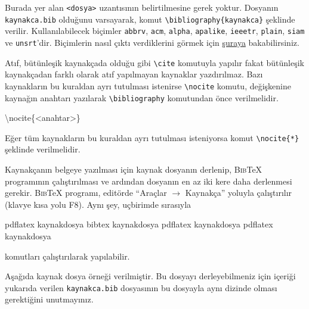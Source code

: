 \documentclass[
  letterpaper,
  DIV=11,
  numbers=noendperiod]{scrreprt}
\newenvironment{Shaded}{\begin{snugshade}}{\end{snugshade}}
\newcommand{\ExtensionTok}[1]{\textcolor[rgb]{0.00,0.23,0.31}{#1}}
\newcommand{\KeywordTok}[1]{\textcolor[rgb]{0.00,0.23,0.31}{#1}}
\newcommand{\NormalTok}[1]{\textcolor[rgb]{0.00,0.23,0.31}{#1}}
\begin{document}
Burada yer alan \texttt{\textless{}dosya\textgreater{}} uzantısının
belirtilmesine gerek yoktur. Dosyanın \texttt{kaynakca.bib} olduğunu
varsayarak, komut \texttt{\textbackslash{}bibliography\{kaynakca\}}
şeklinde verilir. Kullanılabilecek biçimler \texttt{abbrv},
\texttt{acm}, \texttt{alpha}, \texttt{apalike}, \texttt{ieeetr},
\texttt{plain}, \texttt{siam} ve \texttt{unsrt}'dir. Biçimlerin nasıl
çıktı verdiklerini görmek için
\href{https://tr.overleaf.com/learn/latex/Bibtex_bibliography_styles}{şuraya}
bakabilirsiniz.

Atıf, bütünleşik kaynakçada olduğu gibi \texttt{\textbackslash{}cite}
komutuyla yapılır fakat bütünleşik kaynakçadan farklı olarak atıf
yapılmayan kaynaklar yazdırılmaz. Bazı kaynakların bu kuraldan ayrı
tutulması istenirse \texttt{\textbackslash{}nocite} komutu, değişkenine
kaynağın anahtarı yazılarak \texttt{\textbackslash{}bibliography}
komutundan önce verilmelidir.

\begin{Shaded}
\begin{Highlighting}[]
\KeywordTok{\textbackslash{}nocite}\NormalTok{\{}\ExtensionTok{\textless{}anahtar\textgreater{}}\NormalTok{\}}
\end{Highlighting}
\end{Shaded}

Eğer tüm kaynakların bu kuraldan ayrı tutulması isteniyorsa komut
\texttt{\textbackslash{}nocite\{*\}} şeklinde verilmelidir.

Kaynakçanın belgeye yazılması için kaynak dosyanın derlenip,
\textsc{Bib}{\TeX} programının çalıştırılması ve ardından dosyanın en az
iki kere daha derlenmesi gerekir. \textsc{Bib}{\TeX} programı, editörde
``Araçlar \(\rightarrow\) Kaynakça'' yoluyla çalıştırılır (klavye kısa
yolu F8). Aynı şey, uçbirimde sırasıyla

\begin{Shaded}
\begin{Highlighting}[]
\ExtensionTok{pdflatex}\NormalTok{ kaynakdosya}
\ExtensionTok{bibtex}\NormalTok{ kaynakdosya}
\ExtensionTok{pdflatex}\NormalTok{ kaynakdosya}
\ExtensionTok{pdflatex}\NormalTok{ kaynakdosya}
\end{Highlighting}
\end{Shaded}

komutları çalıştırılarak yapılabilir.

Aşağıda kaynak dosya örneği verilmiştir. Bu dosyayı derleyebilmeniz için
içeriği yukarıda verilen \texttt{kaynakca.bib} dosyasının bu dosyayla
aynı dizinde olması gerektiğini unutmayınız.
\end{document}
